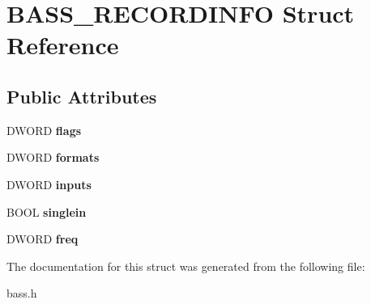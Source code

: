 \hypertarget{structBASS__RECORDINFO}{}\section{B\+A\+S\+S\+\_\+\+R\+E\+C\+O\+R\+D\+I\+N\+F\+O Struct Reference}
\label{structBASS__RECORDINFO}
\subsection*{Public Attributes}
\begin{DoxyCompactItemize}
\item 
\hypertarget{structBASS__RECORDINFO_a97ae96c797ff1c981b459506629bad9c}{}D\+W\+O\+R\+D {\bfseries flags}\label{structBASS__RECORDINFO_a97ae96c797ff1c981b459506629bad9c}

\item 
\hypertarget{structBASS__RECORDINFO_aedfae3cd5f0d09c239eda38ed3ef9c2b}{}D\+W\+O\+R\+D {\bfseries formats}\label{structBASS__RECORDINFO_aedfae3cd5f0d09c239eda38ed3ef9c2b}

\item 
\hypertarget{structBASS__RECORDINFO_a7b049b2bd7f57b9f8fba6f01c0106589}{}D\+W\+O\+R\+D {\bfseries inputs}\label{structBASS__RECORDINFO_a7b049b2bd7f57b9f8fba6f01c0106589}

\item 
\hypertarget{structBASS__RECORDINFO_a5a18b145e6f2bf4670cc815cea5744ec}{}B\+O\+O\+L {\bfseries singlein}\label{structBASS__RECORDINFO_a5a18b145e6f2bf4670cc815cea5744ec}

\item 
\hypertarget{structBASS__RECORDINFO_af643ddd16623da7b0370ab191d8bb204}{}D\+W\+O\+R\+D {\bfseries freq}\label{structBASS__RECORDINFO_af643ddd16623da7b0370ab191d8bb204}

\end{DoxyCompactItemize}


The documentation for this struct was generated from the following file\+:\begin{DoxyCompactItemize}
\item 
bass.\+h\end{DoxyCompactItemize}
